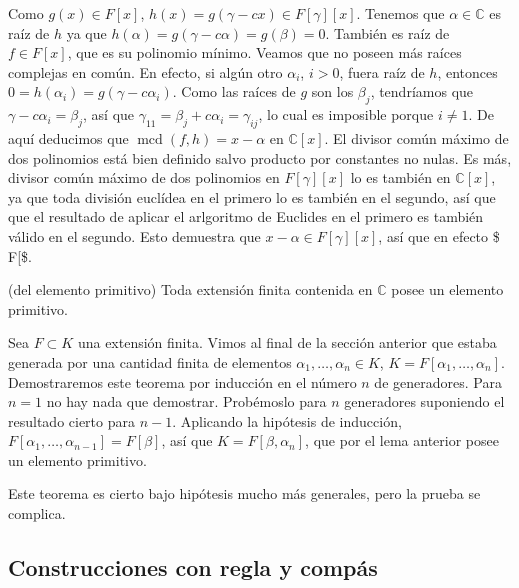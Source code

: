 Como \(g(x)\in F[x]\), \(h(x)=g(\gamma-cx)\in F[\gamma][x]\). Tenemos
que \(\alpha\in \mathbb{C}\) es raíz de \(h\) ya que
\(h(\alpha)=g(\gamma-c\alpha)=g(\beta)=0\). También es raíz de
\(f\in F[x]\), que es su polinomio mínimo. Veamos que no poseen más
raíces complejas en común. En efecto, si algún otro \(\alpha_i\),
\(i>0\), fuera raíz de \(h\), entonces
\(0=h(\alpha_i)=g(\gamma-c\alpha_i)\). Como las raíces de \(g\) son
los \(\beta_j\), tendríamos que \(\gamma-c\alpha_i=\beta_j\), así que
\(\gamma_{11}=\beta_j+c\alpha_i=\gamma_{ij}\), lo cual es imposible
porque \(i\neq 1\). De aquí deducimos que
\(\operatorname{mcd}(f,h)=x-\alpha\) en \(\mathbb{C}[x]\). El divisor
común máximo de dos polinomios está bien definido salvo producto por
constantes no nulas. Es más, divisor común máximo de dos polinomios en
\(F[\gamma][x]\) lo es también en \(\mathbb{C}[x]\), ya que toda
división euclídea en el primero lo es también en el segundo, así que que
el resultado de aplicar el arlgoritmo de Euclides en el primero es
también válido en el segundo. Esto demuestra que
\(x-\alpha\in F[\gamma][x]\), así que en efecto \$
\alpha\in F{[}\gamma{]}\$. 

\textrm{\normalfont (del elemento primitivo)} Toda
extensión finita contenida en \(\mathbb{C}\) posee un elemento
primitivo. 


Sea \(F\subset K\) una extensión finita. Vimos al final de la sección
anterior que estaba generada por una cantidad finita de elementos
\(\alpha_1,\dots,\alpha_n\in K\), \(K=F[\alpha_1,\dots,\alpha_n]\).
Demostraremos este teorema por inducción en el número \(n\) de
generadores. Para \(n=1\) no hay nada que demostrar. Probémoslo para
\(n\) generadores suponiendo el resultado cierto para \(n-1\). Aplicando
la hipótesis de inducción,
\(F[\alpha_1,\dots,\alpha_{n-1}]=F[\beta]\), así que
\(K=F[\beta,\alpha_n]\), que por el lema anterior posee un elemento
primitivo. 

Este teorema es cierto bajo hipótesis mucho más generales, pero la
prueba se complica.

\hypertarget{construcciones-con-regla-y-compuxe1s}{%
\subsection{Construcciones con regla y
compás}\label{construcciones-con-regla-y-compuxe1s}}


